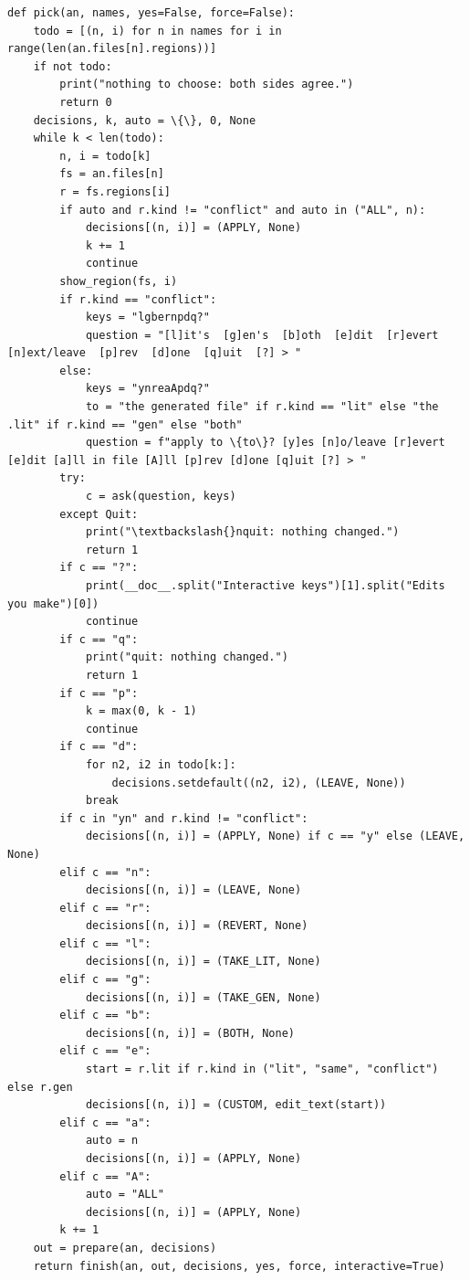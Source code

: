 \documentclass[10pt,a4paper]{article}
\begin{document}
\begin{Verbatim}
def pick(an, names, yes=False, force=False):
    todo = [(n, i) for n in names for i in range(len(an.files[n].regions))]
    if not todo:
        print("nothing to choose: both sides agree.")
        return 0
    decisions, k, auto = \{\}, 0, None
    while k < len(todo):
        n, i = todo[k]
        fs = an.files[n]
        r = fs.regions[i]
        if auto and r.kind != "conflict" and auto in ("ALL", n):
            decisions[(n, i)] = (APPLY, None)
            k += 1
            continue
        show_region(fs, i)
        if r.kind == "conflict":
            keys = "lgbernpdq?"
            question = "[l]it's  [g]en's  [b]oth  [e]dit  [r]evert  [n]ext/leave  [p]rev  [d]one  [q]uit  [?] > "
        else:
            keys = "ynreaApdq?"
            to = "the generated file" if r.kind == "lit" else "the .lit" if r.kind == "gen" else "both"
            question = f"apply to \{to\}? [y]es [n]o/leave [r]evert [e]dit [a]ll in file [A]ll [p]rev [d]one [q]uit [?] > "
        try:
            c = ask(question, keys)
        except Quit:
            print("\textbackslash{}nquit: nothing changed.")
            return 1
        if c == "?":
            print(__doc__.split("Interactive keys")[1].split("Edits you make")[0])
            continue
        if c == "q":
            print("quit: nothing changed.")
            return 1
        if c == "p":
            k = max(0, k - 1)
            continue
        if c == "d":
            for n2, i2 in todo[k:]:
                decisions.setdefault((n2, i2), (LEAVE, None))
            break
        if c in "yn" and r.kind != "conflict":
            decisions[(n, i)] = (APPLY, None) if c == "y" else (LEAVE, None)
        elif c == "n":
            decisions[(n, i)] = (LEAVE, None)
        elif c == "r":
            decisions[(n, i)] = (REVERT, None)
        elif c == "l":
            decisions[(n, i)] = (TAKE_LIT, None)
        elif c == "g":
            decisions[(n, i)] = (TAKE_GEN, None)
        elif c == "b":
            decisions[(n, i)] = (BOTH, None)
        elif c == "e":
            start = r.lit if r.kind in ("lit", "same", "conflict") else r.gen
            decisions[(n, i)] = (CUSTOM, edit_text(start))
        elif c == "a":
            auto = n
            decisions[(n, i)] = (APPLY, None)
        elif c == "A":
            auto = "ALL"
            decisions[(n, i)] = (APPLY, None)
        k += 1
    out = prepare(an, decisions)
    return finish(an, out, decisions, yes, force, interactive=True)
\end{Verbatim}
\end{document}
